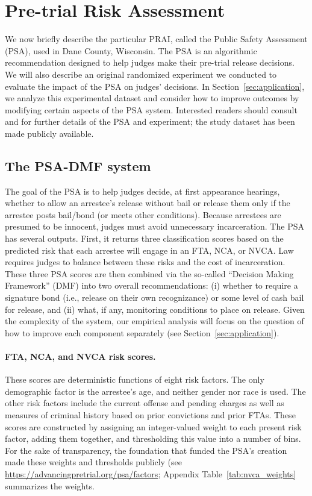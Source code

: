 \documentclass[12pt]{article}
\theoremstyle{definition}
\newcommand{\<}{\langle}
\renewcommand{\>}{\rangle}
\begin{document}
\section{Pre-trial Risk Assessment}
\label{sec:PSA}

We now briefly describe the particular PRAI, called the Public Safety
Assessment (PSA), used in Dane County, Wisconsin.  The PSA is an
algorithmic recommendation designed to help judges make their
pre-trial release decisions.  We will also describe an original
randomized experiment we conducted to evaluate the impact of the PSA
on judges' decisions.  In Section~\ref{sec:application}, we analyze
this experimental dataset and consider how to improve outcomes by
modifying certain aspects of the PSA system.  Interested readers
should consult \citet{greiner2020_rct} and \citet{Imai2020} for
further details of the PSA and experiment; the study dataset has been
made publicly available.


\subsection{The PSA-DMF system}
\label{sec:psa_explain}

The goal of the PSA is to help judges decide, at first appearance
hearings, whether to allow an arrestee's release without bail or
release them only if the arrestee posts bail/bond (or meets other
conditions).  Because arrestees are presumed to be innocent, judges
must avoid unnecessary incarceration.  The PSA has several outputs.
First, it returns three classification scores based on the predicted
risk that each arrestee will engage in an FTA, NCA, or NVCA.  Law
requires judges to balance between these risks and the cost of
incarceration.  These three PSA scores are then combined via the
so-called ``Decision Making Framework'' (DMF) into two overall
recommendations: (i) whether to require a signature bond
(i.e., release on their own recognizance) or some level of cash bail
for release, and (ii) what, if any, monitoring conditions to place on
release.
Given the complexity of the system, 
  our empirical analysis will focus on the question of how to improve each component
separately (see Section~\ref{sec:application}).

\paragraph{FTA, NCA, and NVCA risk scores.}
These scores are deterministic functions of eight risk factors.  The
only demographic factor is the arrestee's age, and neither gender nor
race is used.  The other risk factors include the current offense and
pending charges as well as measures of criminal history based on prior
convictions and prior FTAs.  These scores are constructed by assigning
an integer-valued weight to each present risk factor, adding them
together, and thresholding this value into a number of bins.  For the
sake of transparency, the foundation that funded the PSA’s creation
made these weights and thresholds publicly (see
\href{https://advancingpretrial.org/psa/factors/}{https://advancingpretrial.org/psa/factors};
Appendix Table~\ref{tab:nvca_weights}
 summarizes the weights.
\end{document}
